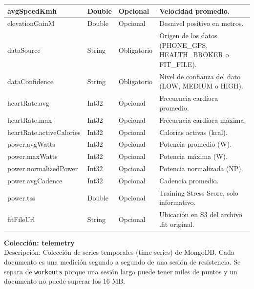 {\begin{longtable}{|>{\raggedright\arraybackslash}p{4.7cm}|>{\raggedright\arraybackslash}p{1.8cm}|>{\raggedright\arraybackslash}p{2.3cm}|>{\raggedright\arraybackslash}p{5.4cm}|}
    avgSpeedKmh & Double & Opcional & Velocidad promedio. \\ \hline
    elevationGainM & Double & Opcional & Desnivel positivo en metros. \\ \hline
    dataSource & String & Obligatorio & Origen de los datos (PHONE\_GPS, HEALTH\_BROKER o FIT\_FILE). \\ \hline
    dataConfidence & String & Obligatorio & Nivel de confianza del dato (LOW, MEDIUM o HIGH). \\ \hline
    heartRate.\allowbreak avg & Int32 & Opcional & Frecuencia cardíaca promedio. \\ \hline
    heartRate.\allowbreak max & Int32 & Opcional & Frecuencia cardíaca máxima. \\ \hline
    heartRate.\allowbreak activeCalories & Int32 & Opcional & Calorías activas (kcal). \\ \hline
    power.\allowbreak avgWatts & Int32 & Opcional & Potencia promedio (W). \\ \hline
    power.\allowbreak maxWatts & Int32 & Opcional & Potencia máxima (W). \\ \hline
    power.\allowbreak normalizedPower & Int32 & Opcional & Potencia normalizada (NP). \\ \hline
    power.\allowbreak avgCadence & Int32 & Opcional & Cadencia promedio. \\ \hline
    power.\allowbreak tss & Double & Opcional & Training Stress Score, solo informativo. \\ \hline
    fitFileUrl & String & Opcional & Ubicación en S3 del archivo .fit original. \\ \hline
\end{longtable}
}
\noindent\textbf{Colección: telemetry} \\
Descripción: Colección de series temporales (time series) de MongoDB. Cada documento es una medición segundo a segundo de una sesión de resistencia. Se separa de \texttt{workouts} porque una sesión larga puede tener miles de puntos y un documento no puede superar los 16 MB.
